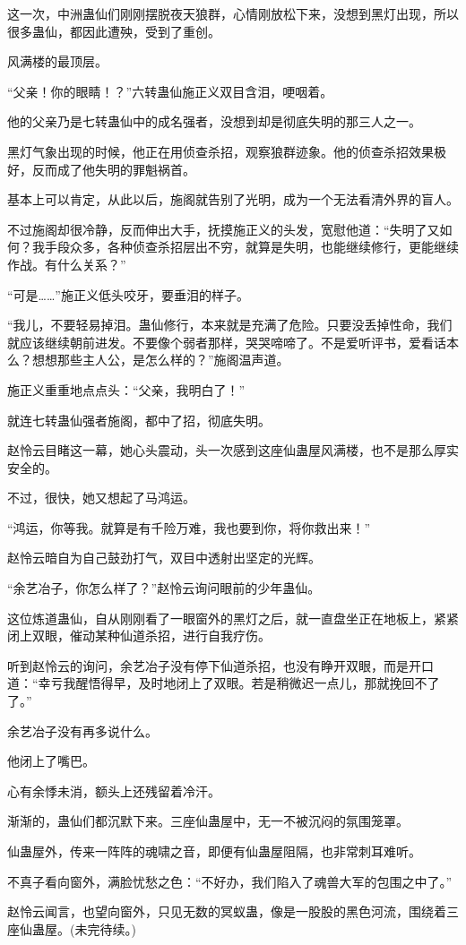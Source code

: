 \begin{this_body}
这一次，中洲蛊仙们刚刚摆脱夜天狼群，心情刚放松下来，没想到黑灯出现，所以很多蛊仙，都因此遭殃，受到了重创。

风满楼的最顶层。

“父亲！你的眼睛！？”六转蛊仙施正义双目含泪，哽咽着。

他的父亲乃是七转蛊仙中的成名强者，没想到却是彻底失明的那三人之一。

黑灯气象出现的时候，他正在用侦查杀招，观察狼群迹象。他的侦查杀招效果极好，反而成了他失明的罪魁祸首。

基本上可以肯定，从此以后，施阁就告别了光明，成为一个无法看清外界的盲人。

不过施阁却很冷静，反而伸出大手，抚摸施正义的头发，宽慰他道：“失明了又如何？我手段众多，各种侦查杀招层出不穷，就算是失明，也能继续修行，更能继续作战。有什么关系？”

“可是……”施正义低头咬牙，要垂泪的样子。

“我儿，不要轻易掉泪。蛊仙修行，本来就是充满了危险。只要没丢掉性命，我们就应该继续朝前进发。不要像个弱者那样，哭哭啼啼了。不是爱听评书，爱看话本么？想想那些主人公，是怎么样的？”施阁温声道。

施正义重重地点点头：“父亲，我明白了！”

就连七转蛊仙强者施阁，都中了招，彻底失明。

赵怜云目睹这一幕，她心头震动，头一次感到这座仙蛊屋风满楼，也不是那么厚实安全的。

不过，很快，她又想起了马鸿运。

“鸿运，你等我。就算是有千险万难，我也要到你，将你救出来！”

赵怜云暗自为自己鼓劲打气，双目中透射出坚定的光辉。

“余艺冶子，你怎么样了？”赵怜云询问眼前的少年蛊仙。

这位炼道蛊仙，自从刚刚看了一眼窗外的黑灯之后，就一直盘坐正在地板上，紧紧闭上双眼，催动某种仙道杀招，进行自我疗伤。

听到赵怜云的询问，余艺冶子没有停下仙道杀招，也没有睁开双眼，而是开口道：“幸亏我醒悟得早，及时地闭上了双眼。若是稍微迟一点儿，那就挽回不了了。”

余艺冶子没有再多说什么。

他闭上了嘴巴。

心有余悸未消，额头上还残留着冷汗。

渐渐的，蛊仙们都沉默下来。三座仙蛊屋中，无一不被沉闷的氛围笼罩。

仙蛊屋外，传来一阵阵的魂啸之音，即便有仙蛊屋阻隔，也非常刺耳难听。

不真子看向窗外，满脸忧愁之色：“不好办，我们陷入了魂兽大军的包围之中了。”

赵怜云闻言，也望向窗外，只见无数的冥蚁蛊，像是一股股的黑色河流，围绕着三座仙蛊屋。(未完待续。)

\end{this_body}

